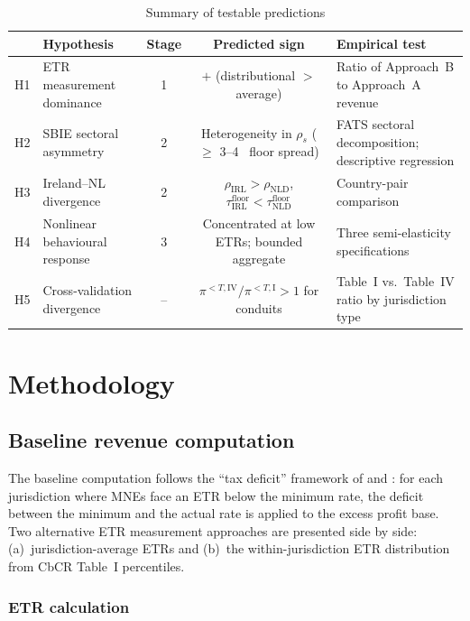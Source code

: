 \documentclass[11pt,a4paper]{article}
\newcommand{\pp}{\text{pp}}
\begin{document}
\begin{table}[H]
\centering
\caption{Summary of testable predictions}
\label{tab:predictions}
\small
\begin{tabular}{@{}clccp{4.5cm}@{}}
\toprule
 & Hypothesis & Stage & Predicted sign & Empirical test \\
\midrule
H1 & ETR measurement dominance & 1 & $+$ (distributional $>$ average) & Ratio of Approach~B to Approach~A revenue \\
H2 & SBIE sectoral asymmetry & 2 & Heterogeneity in $\rho_s$ ($\geq$ 3--4~\pp{} floor spread) & FATS sectoral decomposition; descriptive regression \\
H3 & Ireland--NL divergence & 2 & $\rho_{\text{IRL}} > \rho_{\text{NLD}}$, $\tau_{\text{IRL}}^{\text{floor}} < \tau_{\text{NLD}}^{\text{floor}}$ & Country-pair comparison \\
H4 & Nonlinear behavioural response & 3 & Concentrated at low ETRs; bounded aggregate & Three semi-elasticity specifications \\
H5 & Cross-validation divergence & -- & $\pi^{<T,\text{IV}} / \pi^{<T,\text{I}} > 1$ for conduits & Table~I vs.\ Table~IV ratio by jurisdiction type \\
\bottomrule
\end{tabular}
\end{table}

\newpage
\section{Methodology}\label{sec:methodology}

\subsection{Baseline revenue computation}\label{sec:baseline}

The baseline computation follows the ``tax deficit'' framework of \citet{clausing2021} and \citet{barake2022}: for each jurisdiction where MNEs face an ETR below the minimum rate, the deficit between the minimum and the actual rate is applied to the excess profit base. Two alternative ETR measurement approaches are presented side by side: (a)~jurisdiction-average ETRs and (b)~the within-jurisdiction ETR distribution from CbCR Table~I percentiles. 




\subsubsection{ETR calculation}\label{sec:etr}
\end{document}
